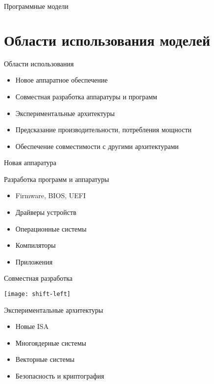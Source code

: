 \begin{frame}{Программные модели}
\centering 
{}

\end{frame}

\section{Области использования моделей}

\begin{frame}{Области использования}

\begin{itemize}
\item Новое аппаратное обеспечение
\item Совместная разработка аппаратуры и программ
\item Экспериментальные архитектуры
\item Предсказание производительности, потребления мощности
\item Обеспечение совместимости с другими архитектурами
\end{itemize}

\end{frame}


\begin{frame}{Новая аппаратура}


\end{frame}

\begin{frame}{Разработка программ и аппаратуры}

\begin{itemize}
\item Firmware, BIOS, UEFI
\item Драйверы устройств
\item Операционные системы
\item Компиляторы
\item Приложения
\end{itemize}

\end{frame}

\begin{frame}{Совместная разработка}

\texttt{[image: shift-left]} %

\end{frame}

\begin{frame}{Экспериментальные архитектуры}

\begin{itemize}
\item Новые ISA
\item Многоядерные системы
\item Векторные системы
\item Безопасность и криптография
\end{itemize}

\end{frame}

